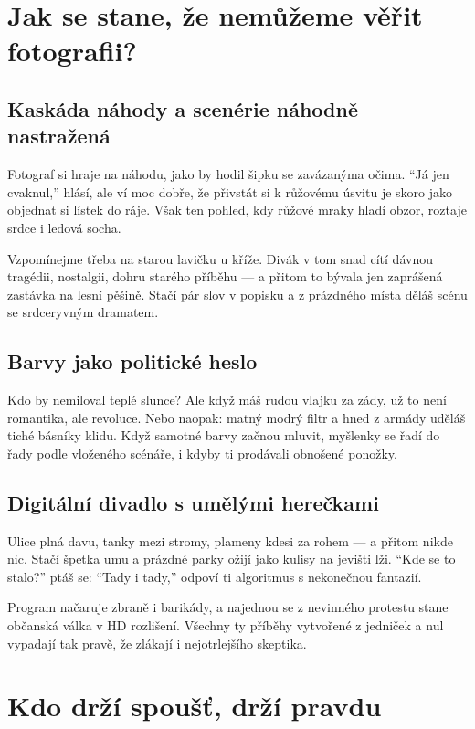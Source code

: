 \documentclass[12pt]{article}
\begin{document}
\section{Jak se stane, že nemůžeme věřit fotografii?} 
\subsection{Kaskáda náhody a scenérie {náhodně} nastražená}
Fotograf si hraje na náhodu, jako by hodil šipku se zavázanýma očima. \enquote{Já jen cvaknul,} hlásí, ale ví moc dobře, 
že přivstát si k růžovému úsvitu je skoro jako objednat si lístek do ráje. Však ten pohled, kdy růžové mraky hladí 
obzor, roztaje srdce i ledová socha.

Vzpomínejme třeba na starou lavičku u kříže. Divák v tom snad cítí dávnou tragédii, nostalgii, dohru starého příběhu --- 
a přitom to bývala jen zaprášená zastávka na lesní pěšině. Stačí pár slov v popisku a z prázdného místa děláš scénu se 
srdceryvným dramatem.

\subsection{Barvy jako politické heslo}
Kdo by nemiloval teplé slunce? Ale když máš rudou vlajku za zády, už to není romantika, ale revoluce. Nebo naopak: 
matný modrý filtr a hned z armády uděláš tiché básníky klidu. Když samotné barvy začnou mluvit, myšlenky se řadí do řady 
podle vloženého scénáře, i kdyby ti prodávali obnošené ponožky.

\subsection{Digitální divadlo s umělými herečkami}
Ulice plná davu, tanky mezi stromy, plameny kdesi za rohem --- a přitom nikde nic. Stačí špetka umu a prázdné parky 
ožijí jako kulisy na jevišti lži. \enquote{Kde se to stalo?} ptáš se: \enquote{Tady i tady,} odpoví ti algoritmus s 
nekonečnou fantazií.

Program načaruje zbraně i barikády, a najednou se z nevinného protestu stane občanská válka v HD rozlišení. Všechny ty 
příběhy vytvořené z jedniček a nul vypadají tak pravě, že zlákají i nejotrlejšího skeptika.

\section{Kdo drží spoušť, drží pravdu}
\end{document}
